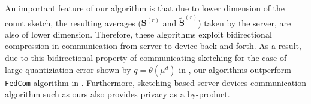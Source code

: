 \documentclass[review,onefignum,onetabnum]{siamart190516}
\begin{document}
\begin{remark}
An important feature of our algorithm is that due to lower dimension of the count sketch, the resulting averages ($\mathbf{S}^{(r)}$ and  $\tilde{\mathbf{S}}^{(r)}$) taken by the server, are also of lower dimension. 
Therefore, these algorithms exploit bidirectional compression in communication from server to device back and forth. 
As a result, due to this bidirectional property of communicating sketching for the case of large quantiziation error shown by $q=\theta(\mu^d)$ in \cite{haddadpour2020federated}, our algorithms outperform \texttt{FedCom} algorithm in \cite{haddadpour2020federated}. 
Furthermore, sketching-based server-devices communication algorithm such as ours also provides privacy as a by-product.
\end{remark}\vspace{-0.3cm}
\end{document}
